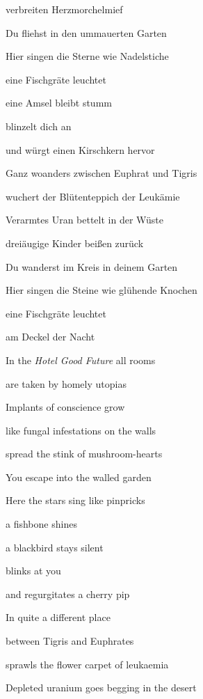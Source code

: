 \documentclass[a4paper]{article}
\begin{document}
verbreiten Herzmorchelmief


\bigskip

Du fliehst in den ummauerten Garten

Hier singen die Sterne wie Nadelstiche

eine Fischgräte leuchtet 

eine Amsel bleibt stumm

blinzelt dich an

und würgt einen Kirschkern hervor


\bigskip

Ganz woanders zwischen Euphrat und Tigris 

wuchert der Blütenteppich der Leukämie

Verarmtes Uran bettelt in der Wüste~ 

dreiäugige Kinder beißen zurück


\bigskip

Du wanderst im Kreis in deinem Garten

Hier singen die Steine wie glühende Knochen

eine Fischgräte leuchtet

am Deckel der Nacht


\bigskip



\bigskip

In the \textit{Hotel Good Future} all rooms

are taken by homely utopias

Implants of conscience grow

like fungal infestations on the walls

spread the stink of mushroom-hearts


\bigskip

You escape into the walled garden

Here the stars sing like pinpricks

a fishbone shines

a blackbird stays silent

blinks at you

and regurgitates a cherry pip


\bigskip

In quite a different place 

between Tigris and Euphrates

sprawls the flower carpet of leukaemia 

Depleted uranium goes begging in the desert
\end{document}
